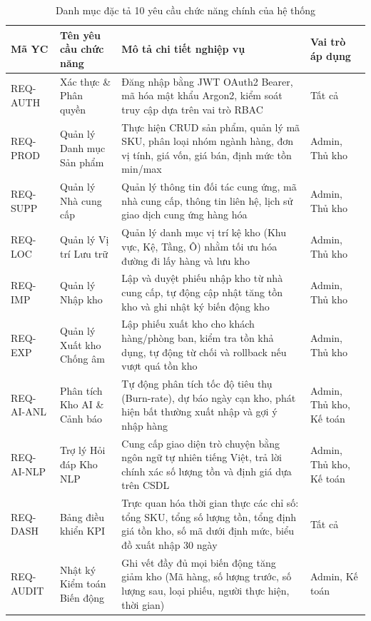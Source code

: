 \begin{table}[h!]
\centering
\caption{Danh mục đặc tả 10 yêu cầu chức năng chính của hệ thống}
\begin{tabular}{|l|l|l|l|}
\hline
\rowcolor{tablehead}
\textbf{Mã YC} & \textbf{Tên yêu cầu chức năng} & \textbf{Mô tả chi tiết nghiệp vụ} & \textbf{Vai trò áp dụng} \\ \hline
REQ-AUTH & Xác thực \& Phân quyền & Đăng nhập bằng JWT OAuth2 Bearer, mã hóa mật khẩu Argon2, kiểm soát truy cập dựa trên vai trò RBAC & Tất cả \\ \hline
REQ-PROD & Quản lý Danh mục Sản phẩm & Thực hiện CRUD sản phẩm, quản lý mã SKU, phân loại nhóm ngành hàng, đơn vị tính, giá vốn, giá bán, định mức tồn min/max & Admin, Thủ kho \\ \hline
REQ-SUPP & Quản lý Nhà cung cấp & Quản lý thông tin đối tác cung ứng, mã nhà cung cấp, thông tin liên hệ, lịch sử giao dịch cung ứng hàng hóa & Admin, Thủ kho \\ \hline
REQ-LOC & Quản lý Vị trí Lưu trữ & Quản lý danh mục vị trí kệ kho (Khu vực, Kệ, Tầng, Ô) nhằm tối ưu hóa đường đi lấy hàng và lưu kho & Admin, Thủ kho \\ \hline
REQ-IMP & Quản lý Nhập kho & Lập và duyệt phiếu nhập kho từ nhà cung cấp, tự động cập nhật tăng tồn kho và ghi nhật ký biến động kho & Admin, Thủ kho \\ \hline
REQ-EXP & Quản lý Xuất kho Chống âm & Lập phiếu xuất kho cho khách hàng/phòng ban, kiểm tra tồn khả dụng, tự động từ chối và rollback nếu vượt quá tồn kho & Admin, Thủ kho \\ \hline
REQ-AI-ANL & Phân tích Kho AI \& Cảnh báo & Tự động phân tích tốc độ tiêu thụ (Burn-rate), dự báo ngày cạn kho, phát hiện bất thường xuất nhập và gợi ý nhập hàng & Admin, Thủ kho, Kế toán \\ \hline
REQ-AI-NLP & Trợ lý Hỏi đáp Kho NLP & Cung cấp giao diện trò chuyện bằng ngôn ngữ tự nhiên tiếng Việt, trả lời chính xác số lượng tồn và định giá dựa trên CSDL & Admin, Thủ kho, Kế toán \\ \hline
REQ-DASH & Bảng điều khiển KPI & Trực quan hóa thời gian thực các chỉ số: tổng SKU, tổng số lượng tồn, tổng định giá tồn kho, số mã dưới định mức, biểu đồ xuất nhập 30 ngày & Tất cả \\ \hline
REQ-AUDIT & Nhật ký Kiểm toán Biến động & Ghi vết đầy đủ mọi biến động tăng giảm kho (Mã hàng, số lượng trước, số lượng sau, loại phiếu, người thực hiện, thời gian) & Admin, Kế toán \\ \hline
\end{tabular}
\end{table}

